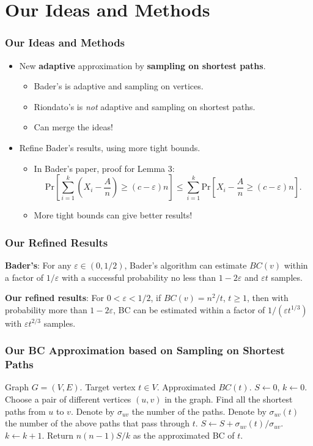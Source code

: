 \documentclass[12pt]{beamer}
\begin{document}
\section{Our Ideas and Methods}
\begin{frame}
	\frametitle{Our Ideas and Methods}
	\begin{itemize}
	\item New {\bf adaptive} approximation by {\bf sampling on shortest paths}.
		\begin{itemize}
		\item Bader's is adaptive and sampling on vertices.
		\item Riondato's is {\it not} adaptive and sampling on shortest paths.
		\item Can merge the ideas!
		\end{itemize}
	\item Refine Bader's results, using more tight bounds.
		\begin{itemize}
			\item In Bader's paper, proof for Lemma 3: $$\mathrm{Pr} [\sum_{i=1}^k \left( X_i - \frac{A}{n} \right) \geq (c-\varepsilon)n] \leq \sum_{i=1}^k\mathrm{Pr}[X_i - \frac{A}{n} \geq (c-\varepsilon)n]. $$
			\item More tight bounds can give better results!
		\end{itemize}
	\end{itemize}
\end{frame}

\begin{frame}
	\frametitle{Our Refined Results}
	{\bf Bader's}: For any $\varepsilon \in (0,1/2)$, Bader's algorithm can estimate $BC(v)$ within a factor of $1/\varepsilon$ with a successful probability no less than $1-2\varepsilon$ and $\varepsilon t$ samples.
	
	{\bf Our refined results}: For $0<\varepsilon < 1/2$, if $BC(v) =  n^2/t$, $t\geq 1$, then with probability more than $1-2\varepsilon$, BC can be estimated within a factor of $1/(\varepsilon t^{1/3})$ with $\varepsilon t^{2/3}$ samples.
\end{frame}

\begin{frame}
	\frametitle{Our BC Approximation based on Sampling on Shortest Paths}
	
	\begin{algorithmic}
	\Require Graph $G=(V, E)$. Target vertex $t\in V$.
	\Ensure Approximated $BC(t)$.
	\State $S \gets 0$, $k \gets 0$.
		\State Choose a pair of different vertices $(u, v)$ in the graph.
		\State Find all the shortest paths from $u$ to $v$. Denote by $\sigma_{uv}$ the number of the paths.
		\State Denote by $\sigma_{uv}(t)$ the number of the above paths that pass through $t$.
		\State $S \gets S + \sigma_{uv}(t)/\sigma_{uv}$.
		\State $k \gets k+1$.
	\EndWhile
	\State Return $n(n-1)S/k$ as the approximated BC of $t$.
	\end{algorithmic}
	
\end{frame}
\end{document}
